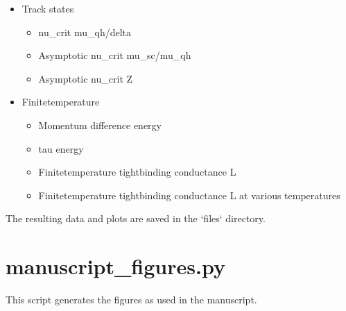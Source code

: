 \documentclass[letterpaper,10pt,english]{sphinxmanual}
\begin{document}
\begin{itemize}
\begin{itemize}
\end{itemize}

\item {} 
\sphinxAtStartPar
Track states
\begin{itemize}
\item {} 
\sphinxAtStartPar
nu\_crit  mu\_qh/delta

\item {} 
\sphinxAtStartPar
Asymptotic nu\_crit  mu\_sc/mu\_qh

\item {} 
\sphinxAtStartPar
Asymptotic nu\_crit  Z

\end{itemize}

\item {} 
\sphinxAtStartPar
Finite\sphinxhyphen{}temperature
\begin{itemize}
\item {} 
\sphinxAtStartPar
Momentum difference  energy

\item {} 
\sphinxAtStartPar
tau  energy

\item {} 
\sphinxAtStartPar
Finite\sphinxhyphen{}temperature tight\sphinxhyphen{}binding conductance  L

\item {} 
\sphinxAtStartPar
Finite\sphinxhyphen{}temperature tight\sphinxhyphen{}binding conductance  L at various temperatures

\end{itemize}

\end{itemize}

\sphinxAtStartPar
The resulting data and plots are saved in the ‘files‘ directory.


\section{manuscript\_figures.py}
\label{\detokenize{main_scripts:module-manuscript_figures}}\label{\detokenize{main_scripts:manuscript-figures-py}}
\sphinxAtStartPar
This script generates the figures as used in the manuscript.
\end{document}
